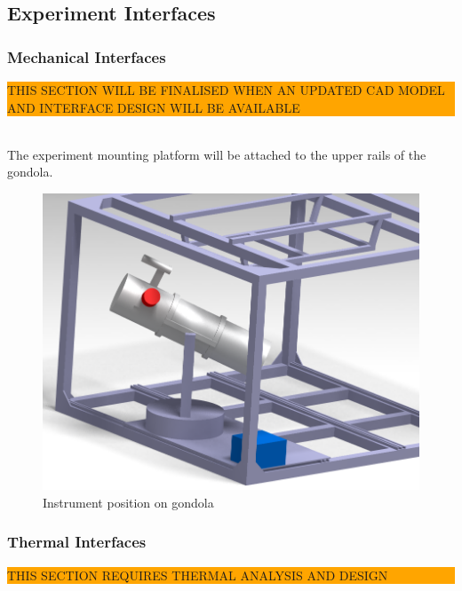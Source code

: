 \subsection{Experiment Interfaces}

\subsubsection{Mechanical Interfaces}
\label{sec:4.2.1}

\colorbox{orange}{\parbox{\textwidth}{THIS SECTION WILL BE FINALISED WHEN AN UPDATED CAD MODEL AND INTERFACE DESIGN WILL BE AVAILABLE}}\\

The experiment mounting platform will be attached to the upper rails of the gondola.



\begin{figure}[H]
    \centering
	\includegraphics[width=0.9\linewidth]{4-experiment-design/img/interfaces/Assembly_3.png}
	\caption{Instrument position on gondola}
\end{figure}


% 


\subsubsection{Thermal Interfaces}

\colorbox{orange}{\parbox{\textwidth}{THIS SECTION REQUIRES THERMAL ANALYSIS AND DESIGN}}\\

